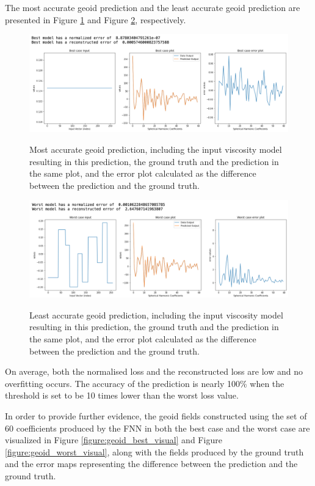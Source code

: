 The most accurate geoid prediction and the least accurate geoid prediction are presented in Figure \ref{figure:geoid_best} and Figure \ref{figure:geoid_worst}, respectively.

\begin{figure}[H]
    \caption{Most accurate geoid prediction, including the input viscosity model resulting in this prediction, the ground truth and the prediction in the same plot, and the error plot calculated as the difference between the prediction and the ground truth.}
    \includegraphics[scale=0.6]{figures/geoid_images/Geoid_Best.png}
    \label{figure:geoid_best}
\end{figure}

\begin{figure}[H]
    \caption{Least accurate geoid prediction, including the input viscosity model resulting in this prediction, the ground truth and the prediction in the same plot, and the error plot calculated as the difference between the prediction and the ground truth.}
    \includegraphics[scale=0.6]{figures/geoid_images/Geoid_Worst.png}
    \label{figure:geoid_worst}
\end{figure}

On average, both the normalised loss and the reconstructed loss are low and no overfitting occurs. The accuracy of the prediction is nearly 100\% when the threshold is set to be 10 times lower than the worst loss value. 

In order to provide further evidence, the geoid fields constructed using the set of 60 coefficients produced by the FNN in both the best case and the worst case are visualized in Figure \ref{figure:geoid_best_visual} and Figure \ref{figure:geoid_worst_visual}, along with the fields produced by the ground truth and the error maps representing the difference between the prediction and the ground truth.


